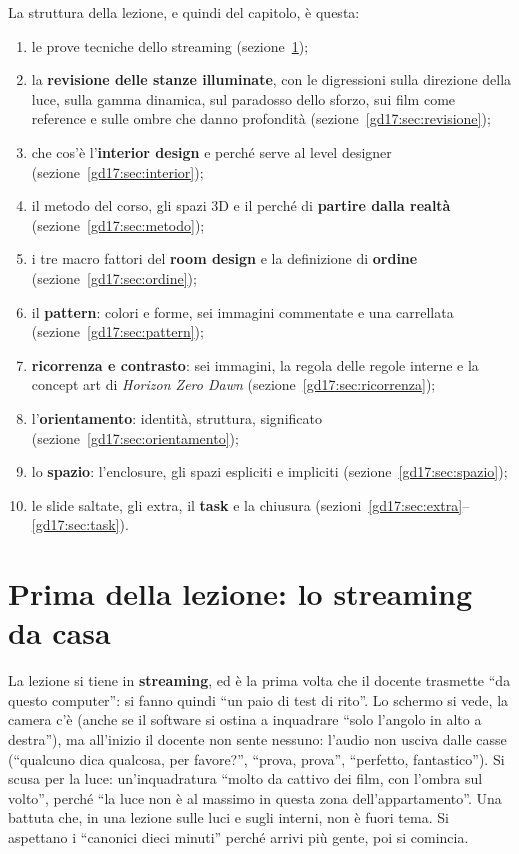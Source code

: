 La struttura della lezione, e quindi del capitolo, è questa:
\begin{enumerate}
  \item le prove tecniche dello streaming (sezione~\ref{gd17:sec:streaming});
  \item la \textbf{revisione delle stanze illuminate}, con le digressioni sulla
        direzione della luce, sulla gamma dinamica, sul paradosso dello sforzo,
        sui film come reference e sulle ombre che danno profondità
        (sezione~\ref{gd17:sec:revisione});
  \item che cos'è l'\textbf{interior design} e perché serve al level designer
        (sezione~\ref{gd17:sec:interior});
  \item il metodo del corso, gli spazi 3D e il perché di \textbf{partire dalla
        realtà} (sezione~\ref{gd17:sec:metodo});
  \item i tre macro fattori del \textbf{room design} e la definizione di
        \textbf{ordine} (sezione~\ref{gd17:sec:ordine});
  \item il \textbf{pattern}: colori e forme, sei immagini commentate e una
        carrellata (sezione~\ref{gd17:sec:pattern});
  \item \textbf{ricorrenza e contrasto}: sei immagini, la regola delle regole
        interne e la concept art di \emph{Horizon Zero Dawn}
        (sezione~\ref{gd17:sec:ricorrenza});
  \item l'\textbf{orientamento}: identità, struttura, significato
        (sezione~\ref{gd17:sec:orientamento});
  \item lo \textbf{spazio}: l'enclosure, gli spazi espliciti e impliciti
        (sezione~\ref{gd17:sec:spazio});
  \item le slide saltate, gli extra, il \textbf{task} e la chiusura
        (sezioni~\ref{gd17:sec:extra}--\ref{gd17:sec:task}).
\end{enumerate}

\section{Prima della lezione: lo streaming da casa}
\label{gd17:sec:streaming}

La lezione si tiene in \textbf{streaming}, ed è la prima volta che il docente trasmette
``da questo computer'': si fanno quindi ``un paio di test di rito''. Lo schermo si vede,
la camera c'è (anche se il software si ostina a inquadrare ``solo l'angolo in alto a
destra''), ma all'inizio il docente non sente nessuno: l'audio non usciva dalle casse
(``qualcuno dica qualcosa, per favore?'', ``prova, prova'', ``perfetto, fantastico'').
Si scusa per la luce: un'inquadratura ``molto da cattivo dei film, con l'ombra sul
volto'', perché ``la luce non è al massimo in questa zona dell'appartamento''. Una
battuta che, in una lezione sulle luci e sugli interni, non è fuori tema. Si aspettano
i ``canonici dieci minuti'' perché arrivi più gente, poi si comincia.

